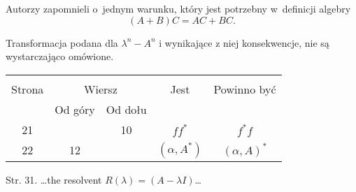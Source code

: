 \documentclass[a4paper,11pt]{article}
\begin{document}

\start {} Autorzy zapomnieli o~jednym warunku, który jest
potrzebny w~definicji algebry
\begin{equation}
  \label{eq:BR-s01-01}
  ( A + B ) C = A C + B C.
\end{equation}

\vspace{\spaceFour}


\start {} Transformacja podana dla $\lambda^{ n } - A^{ n }$ i
wynikające z niej konsekwencje, nie są wystarczająco omówione.

\vspace{\spaceFour}


\begin{center}
  \begin{tabular}{|c|c|c|c|c|}
    \hline
    & \multicolumn{2}{c|}{} & & \\
    Strona & \multicolumn{2}{c|}{Wiersz} & Jest
                              & Powinno być \\ \cline{2-3}
    & Od góry & Od dołu & & \\
    \hline
    21  & & 10 & $ff^{ * }$ & $f^{ * }\! f$ \\
    22  & 12 & & $( \alpha, A^{ * } )$ & $( \alpha, A )^{ * }$ \\
    \hline
  \end{tabular}
\end{center}
Str. 31. \ldots the resolvent $R( \lambda ) = ( A - \lambda I )$\ldots
\end{document}
